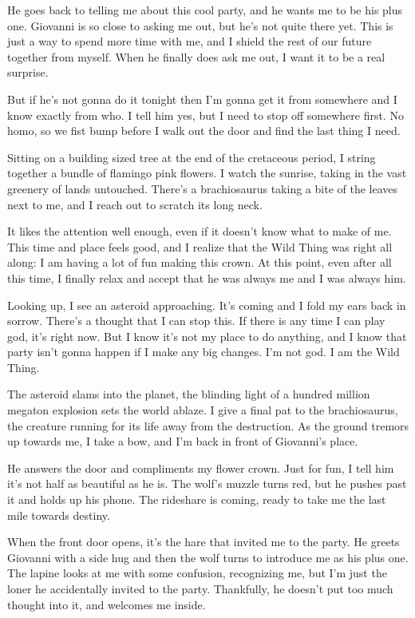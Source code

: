 He goes back to telling me about this cool party, and he wants me to be his plus one. Giovanni is so close to asking me out, but he's not quite there yet. This is just a way to spend more time with me, and I shield the rest of our future together from myself. When he finally does ask me out, I want it to be a real surprise.

But if he's not gonna do it tonight then I'm gonna get it from somewhere and I know exactly from who. I tell him yes, but I need to stop off somewhere first. No homo, so we fist bump before I walk out the door and find the last thing I need.

Sitting on a building sized tree at the end of the cretaceous period, I string together a bundle of flamingo pink flowers. I watch the sunrise, taking in the vast greenery of lands untouched. There's a brachiosaurus taking a bite of the leaves next to me, and I reach out to scratch its long neck.

It likes the attention well enough, even if it doesn't know what to make of me. This time and place feels good, and I realize that the Wild Thing was right all along: I am having a lot of fun making this crown. At this point, even after all this time, I finally relax and accept that he was always me and I was always him.

Looking up, I see an asteroid approaching. It's coming and I fold my ears back in sorrow. There's a thought that I can stop this. If there is any time I can play god, it's right now. But I know it's not my place to do anything, and I know that party isn't gonna happen if I make any big changes. I'm not god. I am the Wild Thing.

The asteroid slams into the planet, the blinding light of a hundred million megaton explosion sets the world ablaze. I give a final pat to the brachiosaurus, the creature running for its life away from the destruction. As the ground tremors up towards me, I take a bow, and I'm back in front of Giovanni's place.

He answers the door and compliments my flower crown. Just for fun, I tell him it's not half as beautiful as he is. The wolf's muzzle turns red, but he pushes past it and holds up his phone. The rideshare is coming, ready to take me the last mile towards destiny.

When the front door opens, it's the hare that invited me to the party. He greets Giovanni with a side hug and then the wolf turns to introduce me as his plus one. The lapine looks at me with some confusion, recognizing me, but I'm just the loner he accidentally invited to the party. Thankfully, he doesn't put too much thought into it, and welcomes me inside.

